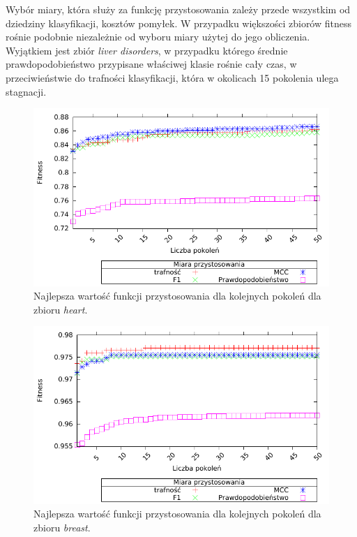 Wybór miary, która służy za funkcję przystosowania zależy przede wszystkim od dziedziny klasyfikacji, kosztów pomyłek. W przypadku większości zbiorów fitness rośnie podobnie niezależnie od wyboru miary użytej do jego obliczenia. Wyjątkiem jest zbiór \emph{liver disorders}, w przypadku którego średnie prawdopodobieństwo przypisane właściwej klasie rośnie cały czas, w przeciwieństwie do trafności klasyfikacji, która w okolicach 15 pokolenia ulega stagnacji.
 


	\begin{figure}
		\includegraphics[scale=0.90]{figures/results/fitness/fitness-heart}
		\caption{Najlepsza wartość funkcji przystosowania dla kolejnych pokoleń dla zbioru \emph{heart}.\label{fig:fit-heart}}
	\end{figure}
	
	\begin{figure}
		\includegraphics[scale=0.90]{figures/results/fitness/fitness-breast}
		\caption{Najlepsza wartość funkcji przystosowania dla kolejnych pokoleń dla zbioru \emph{breast}.\label{fig:fit-breast}}
	\end{figure}	
	

